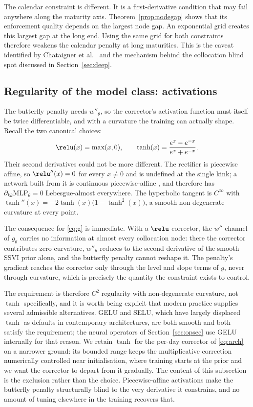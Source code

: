 The calendar constraint is different. It is a first-derivative condition that may fail anywhere along the maturity axis. Theorem~\ref{prop:nodegap} shows that its enforcement quality depends on the largest node gap. An exponential grid creates this largest gap at the long end. Using the same grid for both constraints therefore weakens the calendar penalty at long maturities. This is the caveat identified by Chataigner et al.~\cite{chataigner2020} and the mechanism behind the collocation blind spot discussed in Section~\ref{sec:deep}.


\subsection{Regularity of the model class: activations}
The butterfly penalty needs $w''_\theta$, so the corrector's activation function must itself be
twice differentiable, and with a curvature the training can actually shape. Recall the two
canonical choices:
\begin{equation}\label{eq:activations}
\relu(x)=\max(x,0),
\qquad
\tanh(x)=\frac{e^{x}-e^{-x}}{e^{x}+e^{-x}} .
\end{equation}
Their second derivatives could not be more different. The rectifier is piecewise affine, so
$\relu''(x)=0$ for every $x\neq0$ and is undefined at the single kink; a network built from it
is continuous piecewise-affine \cite{hornik1991,baydin2018}, and therefore has $\partial_{kk}\mathrm{MLP}_\theta=0$ Lebesgue-almost
everywhere. The hyperbolic tangent is $C^\infty$ with $\tanh''(x)=-2\tanh(x)\bigl(1-\tanh^2(x)\bigr)$,
a smooth non-degenerate curvature at every point.

The consequence for \eqref{eq:g} is immediate. With a $\relu$ corrector, the $w''$ channel of
$g_\theta$ carries no information at almost every collocation node: there the corrector
contributes zero curvature, $w''_\theta$ reduces to the second derivative of the smooth SSVI
prior alone, and the butterfly penalty cannot reshape it. The penalty's gradient reaches the
corrector only through the level and slope terms of $g$, never through curvature, which is
precisely the quantity the constraint exists to control.

The requirement is therefore $C^2$ regularity with non-degenerate curvature, not $\tanh$
specifically, and it is worth being explicit that modern practice supplies several admissible
alternatives. GELU and SELU, which have largely displaced $\tanh$ as defaults in contemporary
architectures, are both smooth and both satisfy the requirement; the neural operators of
Section~\ref{sec:opsec} use GELU internally for that reason. We retain $\tanh$ for the per-day
corrector of \eqref{eq:arch} on a narrower ground: its bounded range keeps the multiplicative
correction numerically controlled near initialisation, where training starts at the prior and we
want the corrector to depart from it gradually. The content of this subsection is the exclusion
rather than the choice. Piecewise-affine activations make the butterfly penalty structurally
blind to the very derivative it constrains, and no amount of tuning elsewhere in the training
recovers that.

